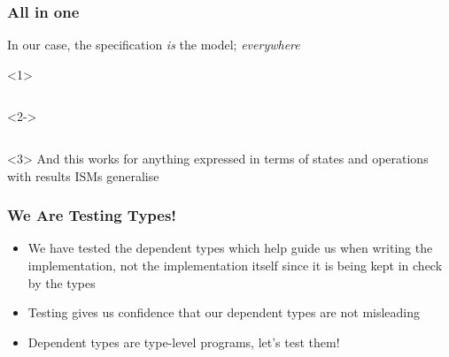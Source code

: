 \documentclass[compress]{beamer}
\begin{document}
\begin{frame}[fragile]
  \frametitle{All in one}

  \large

  
  In our case, the specification \textit{is} the model; \textit{everywhere}

  \begin{onlyenv}<1>
  \inputminted{Idris}{qc-things/ATM-arb-trace.idr}
  \end{onlyenv}

  \begin{onlyenv}<2->
  \inputminted[highlightlines=4-5,highlightcolor=highl]{Idris}{qc-things/ATM-arb-trace.idr}
  \end{onlyenv}

  \begin{onlyenv}<3>
  And this works for anything expressed in terms of states and operations with
  results {\textemdash} ISMs generalise
  \end{onlyenv}

\end{frame}


\begin{frame}
  \frametitle{We Are Testing Types!}

  \large

  \begin{itemize}
    \item<1-> We have tested the dependent types which help guide us when
              writing the implementation, not the implementation itself since it
              is being kept in check by the types
    \item<2-> Testing gives us confidence that our dependent types are not
              misleading
    \item<3-> Dependent types are type-level programs, let's test them!
  \end{itemize}

\end{frame}
\end{document}
